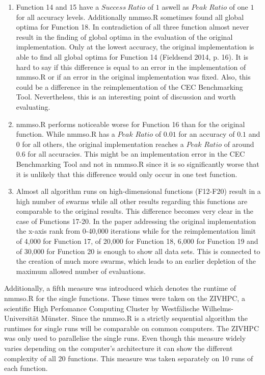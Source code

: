 \documentclass[12pt,a4paper]{article}
\begin{document}
\begin{enumerate}
\def\labelenumi{(\arabic{enumi})}
\item
  Function 14 and 15 have a \(Success\ Ratio\) of \(1\) aswell as
  \(Peak\) \(Ratio\) of one \(1\) for all accuracy levels. Additionally
  nmmso.R sometimes found all global optima for Function 18. In
  contradiction of all three function almost never result in the finding
  of global optima in the evaluation of the original implementation.
  Only at the lowest accuracy, the original implementation is able to
  find all global optima for Function 14 (Fieldsend 2014, p. 16). It is
  hard to say if this difference is equal to an error in the
  implementation of nmmso.R or if an error in the original
  implementation was fixed. Also, this could be a difference in the
  reimplementation of the CEC Benchmarking Tool. Nevertheless, this is
  an interesting point of discussion and worth evaluating.
\item
  nmmso.R performs noticeable worse for Function 16 than for the
  original function. While nmmso.R has a \(Peak\) \(Ratio\) of \(0.01\)
  for an accuracy of \(0.1\) and \(0\) for all others, the original
  implementation reaches a \(Peak\) \(Ratio\) of around \(0.6\) for all
  accuracies. This might be an implementation error in the CEC
  Benchmarking Tool and not in nmmso.R since it is so significantly
  worse that it is unlikely that this difference would only occur in one
  test function.
\item
  Almost all algorithm runs on high-dimensional functions (F12-F20)
  result in a high number of swarms while all other results regarding
  this functions are comparable to the original results. This difference
  becomes very clear in the case of Functions 17-20. In the paper
  addressing the original implementation the x-axis rank from 0-40,000
  iterations while for the reimplementation limit of 4,000 for Function
  17, of 20,000 for Function 18, 6,000 for Function 19 and of 30,000 for
  Function 20 is enough to show all data sets. This is connected to the
  creation of much more swarms, which leads to an earlier depletion of
  the maximum allowed number of evaluations.
\end{enumerate}

Additionally, a fifth measure was introduced which denotes the runtime
of nmmso.R for the single functions. These times were taken on the
ZIVHPC, a scientific High Perfomance Computing Cluster by Westfälische
Wilhelms-Universität Münster. Since the nmmso.R is a strictly sequential
algorithm the runtimes for single runs will be comparable on common
computers. The ZIVHPC was only used to parallelise the single runs. Even
though this measure widely varies depending on the computer's
architecture it can show the different complexity of all 20 functions.
This measure was taken separately on 10 runs of each function.
\end{document}
